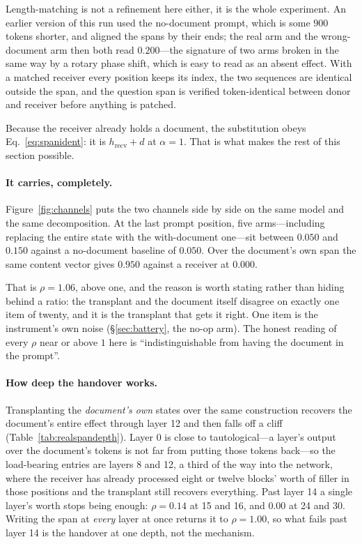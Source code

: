 \documentclass{article}
\newcommand{\dvec}{\ensuremath{d}}
\begin{document}
Length-matching is not a refinement here either, it is the whole experiment. An
earlier version of this run used the no-document
prompt, which is some $900$ tokens shorter, and aligned the spans by their ends;
the real arm and the wrong-document arm then both read $0.200$---the signature
of two arms broken in the same way by a rotary phase shift, which is easy to
read as an absent effect. With a matched receiver every position keeps its
index, the two sequences are identical outside the span, and the question span
is verified token-identical between donor and receiver before anything is
patched.

Because the receiver already holds a document, the substitution obeys
Eq.~\ref{eq:spanident}: it is $h_{\text{recv}} + \dvec$ at $\alpha=1$. That is
what makes the rest of this section possible.

\paragraph{It carries, completely.} Figure~\ref{fig:channels} puts the two
channels side by side on the same model and the same decomposition. At the last
prompt position, five arms---including replacing the entire state with the
with-document one---sit between $0.050$ and $0.150$ against a no-document
baseline of $0.050$. Over the document's own span the same content vector gives
$0.950$ against a receiver at $0.000$.

That is $\rho = 1.06$, above one, and the reason is worth stating rather than
hiding behind a ratio: the transplant and the document itself disagree on
exactly one item of twenty, and it is the transplant that gets it right. One
item is the instrument's own noise (\S\ref{sec:battery}, the no-op arm). The
honest reading of every $\rho$ near or above $1$ here is ``indistinguishable
from having the document in the prompt''.



\paragraph{How deep the handover works.} Transplanting the \emph{document's own}
states over the same construction recovers the document's entire effect through
layer 12 and then falls off a cliff (Table~\ref{tab:realspandepth}). Layer 0 is
close to tautological---a layer's output over the document's tokens is not far
from putting those tokens back---so the load-bearing entries are layers 8 and
12, a third of the way into
the network, where the receiver has already processed eight or twelve blocks'
worth of filler in those positions and the transplant still recovers
everything. Past layer 14 a single layer's worth stops being enough: $\rho =
0.14$ at 15 and 16, and $0.00$ at 24 and 30. Writing
the span at \emph{every} layer at once returns it to $\rho = 1.00$, so what
fails past layer 14 is the handover at one depth, not the mechanism.
\end{document}
